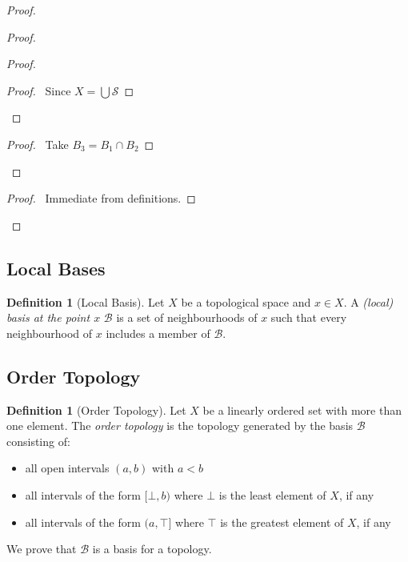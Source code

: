 \documentclass{book}
\theoremstyle{definition}
\newtheorem{df}[lm]{Definition}
\begin{document}
  \begin{proof}
    \begin{proof}
      \begin{proof}
        \begin{proof}
          \pf\ Since $X = \bigcup \mathcal{S}$
        \end{proof}
      \end{proof}
      \begin{proof}
        \pf\ Take $B_3 = B_1 \cap B_2$
      \end{proof}
    \end{proof}
    \begin{proof}
      \pf\ Immediate from definitions.
    \end{proof}
  \end{proof}
  
  \subsection{Local Bases}
  
  \begin{df}[Local Basis]
    Let $X$ be a topological space and $x \in X$. A \emph{(local) basis at the 
      point $x$} $\mathcal{B}$ is a set of neighbourhoods of $x$ such that 
    every 
    neighbourhood of $x$ includes a member of $\mathcal{B}$.
  \end{df}
  
  \subsection{Order Topology}
  
  \begin{df}[Order Topology]
    Let $X$ be a linearly ordered set with more than one element. The 
    \emph{order 
      topology} is the topology generated by the basis $\mathcal{B}$ consisting 
    of:
    \begin{itemize}
      \item all open intervals $(a,b)$ with $a < b$
      \item all intervals of the form $[\bot, b)$ where $\bot$ is the least 
      element 
      of $X$, if any
      \item all intervals of the form $(a, \top]$ where $\top$ is the greatest 
      element of $X$, if any
    \end{itemize}
    
    We prove that $\mathcal{B}$ is a basis for a topology.
  \end{df}
  
\end{document}
